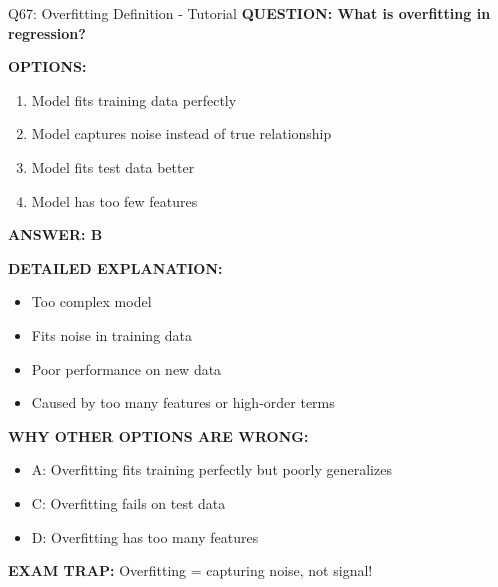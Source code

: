 \documentclass[8pt]{beamer}
\begin{document}
	\begin{frame}{Q67: Overfitting Definition - Tutorial}
		\fontsize{6.5}{7.5}\selectfont
		\textbf{QUESTION: What is overfitting in regression?}
		
		\vspace{0.1cm}
		\textbf{OPTIONS:}
		\begin{enumerate}
			\item Model fits training data perfectly
			\item Model captures noise instead of true relationship
			\item Model fits test data better
			\item Model has too few features
		\end{enumerate}
		
		\vspace{0.1cm}
		\textcolor{myblue}{\textbf{ANSWER: B}}
		
		\vspace{0.1cm}
		\textbf{DETAILED EXPLANATION:}
		\begin{itemize}
			\item Too complex model
			\item Fits noise in training data
			\item Poor performance on new data
			\item Caused by too many features or high-order terms
		\end{itemize}
		
		\vspace{0.1cm}
		\textcolor{myred}{\textbf{WHY OTHER OPTIONS ARE WRONG:}}
		\begin{itemize}
			\item \textcolor{myred}{A:} Overfitting fits training perfectly but poorly generalizes
			\item \textcolor{myred}{C:} Overfitting fails on test data
			\item \textcolor{myred}{D:} Overfitting has too many features
		\end{itemize}
		
		\textcolor{myred}{\textbf{EXAM TRAP:}} Overfitting = \textcolor{myblue}{capturing noise, not signal}!
	\end{frame}
	
\end{document}
